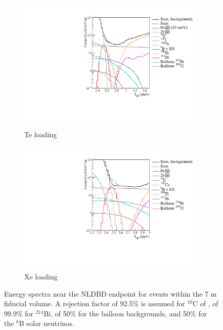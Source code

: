 \begin{figure}
\centering
\begin{subfigure}[b]{0.40\textwidth}
 \includegraphics[width=\textwidth]{dbd/spectrum_plot_te_5.pdf}
 \caption{Te loading}
 \label{fig:spectrum-te}
\end{subfigure}
\begin{subfigure}[b]{0.40\textwidth}
 \includegraphics[width=\textwidth]{dbd/spectrum_plot_xe.pdf}
 \caption{Xe loading}
 \label{fig:spectrum-xe}
\end{subfigure}
\caption{Energy spectra near the NLDBD endpoint for events within the 7 m
fiducial volume. A rejection factor of 92.5\% is assumed for $^{10}$C of , of 99.9\% for $^{214}$Bi, of 50\% for the balloon backgrounds, and 50\% for the $^8$B solar neutrinos.}
\label{fig:spectrum-plots}
\end{figure}


